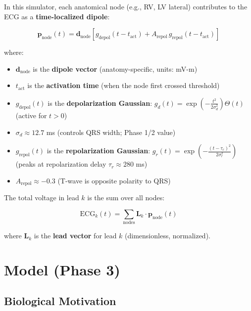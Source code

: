 \documentclass[12pt,a4paper,oneside]{book}
\begin{document}
In this simulator, each anatomical node (e.g., RV, LV lateral) contributes to the ECG as a \textbf{time-localized dipole}:

\begin{equation}
\label{eq:dipole_gaussian}
\mathbf{p}_{\text{node}}(t) = \mathbf{d}_{\text{node}} \left[ g_{\text{depol}}(t-t_{\text{act}}) + A_{\text{repol}} \, g_{\text{repol}}(t-t_{\text{act}}) \right]
\end{equation}

where:

\begin{itemize}
    \item $\mathbf{d}_{\text{node}}$ is the \textbf{dipole vector} (anatomy-specific, units: mV-m)
    \item $t_{\text{act}}$ is the \textbf{activation time} (when the node first crossed threshold)
    \item $g_{\text{depol}}(t)$ is the \textbf{depolarization Gaussian}: $g_d(t) = \exp\left(-\frac{t^2}{2\sigma_d^2}\right) \Theta(t)$ (active for $t > 0$)
    \item $\sigma_d \approx 12.7$ ms (controls QRS width; Phase 1/2 value)
    \item $g_{\text{repol}}(t)$ is the \textbf{repolarization Gaussian}: $g_r(t) = \exp\left(-\frac{(t-\tau_r)^2}{2\sigma_r^2}\right)$ (peaks at repolarization delay $\tau_r \approx 280$ ms)
    \item $A_{\text{repol}} \approx -0.3$ (T-wave is opposite polarity to QRS)
\end{itemize}

The total \ecg voltage in lead $k$ is the sum over all nodes:

\begin{equation}
\label{eq:ecg_lead}
\text{ECG}_k(t) = \sum_{\text{nodes}} \mathbf{L}_k \cdot \mathbf{p}_{\text{node}}(t)
\end{equation}

where $\mathbf{L}_k$ is the \textbf{lead vector} for lead $k$ (dimensionless, normalized).

\section{\fhn Model (Phase 3)}

\subsection{Biological Motivation}
\end{document}
